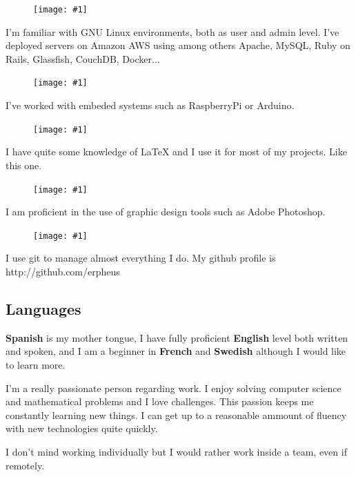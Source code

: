 \documentclass[a4paper, 10pt]{article}
\newcommand{\CVSubsection}[1]{ { \setromanfont[Numbers=Uppercase]{Helvetica}\selectfont \subsection*{#1} } }
\newcommand{\skill}[5]{
			\begin{minipage}{0.85\linewidth}
				\begin{figure} 
					\vspace{#3}

					\hspace*{#5}\texttt{[image: \#1]}
				\end{figure} {#2}
			\end{minipage}
		}
\begin{document}
\begin{multicols}{2}
				\vspace{2mm}

				\skill{images/linux.png}{I'm familiar with GNU Linux environments, both as user and admin level. I've deployed servers on Amazon AWS using among others Apache, MySQL, Ruby on Rails, Glassfish, CouchDB, Docker...}{-4mm}{1.2cm}{0.5mm}

				\vspace{2mm}

				\skill{images/raspberry.png}{I've worked with embeded systems such as RaspberryPi or Arduino.}{-4.5mm}{0.8cm}{2.2mm}

				\vspace{2mm}

				\skill{images/tex.png}{I have quite some knowledge of LaTeX and I use it for most of my projects. Like this one.}{-6mm}{0.9cm}{2.2mm}

				\vspace{2mm}

				\skill{images/photoshop.png}{I am proficient in the use of graphic design tools such as Adobe Photoshop.}{-5mm}{0.8cm}{2.5mm}

				\vspace{2mm}

				\skill{images/git.png}{I use git to manage almost everything I do. My github profile is http://github.com/erpheus}{-4.5mm}{0.8cm}{2.5mm}	

				\setlength{\leftskip}{0mm}

				\vspace{2mm}
				\CVSubsection{Languages}
				\vspace{-2mm}
				{\fontsize{1.1em}{1em}\selectfont \textbf{Spanish}} is my mother tongue, I have fully proficient {\fontsize{1.1em}{1em}\selectfont \textbf{English}} level both written and spoken, and I am a beginner in {\fontsize{1.1em}{1em}\selectfont \textbf{French}} and {\fontsize{1.1em}{1em}\selectfont \textbf{Swedish}} although I would like to learn more.		


	\end{multicols}

	\vfill

	{\fontsize{1.4em}{1.4em}\selectfont 
		I’m a really passionate person regarding work. I enjoy solving computer science and mathematical problems and I love challenges. This passion keeps me constantly learning new things. I can get up to a reasonable ammount of fluency with new technologies quite quickly.

		\vspace{2mm}

		I don’t mind working individually but I would rather work inside a team, even if remotely.
	}
\end{document}
